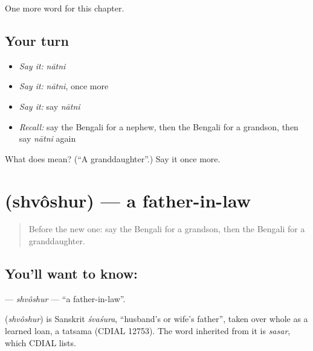 \begin{grammarlens}[title={What you've built}]
One more word for this chapter.
\end{grammarlens}

\subsection*{Your turn}
\begin{itemize}
\raggedright
  \item \emph{Say it:} \emph{nātni}
  \item \emph{Say it:} \emph{nātni}, once more
  \item \emph{Say it:} say \emph{nātni}
  \item \emph{Recall:} say the Bengali for a nephew, then the Bengali for a grandson, then say \emph{nātni} again
\end{itemize}

\begin{tcolorbox}[breakable,colback=teal!4,colframe=teal!35!black,title={Before you move on}]
What does  mean? (\textquotedblleft{}A granddaughter\textquotedblright{}.) Say it once more.
\end{tcolorbox}
\section[\texorpdfstring{\bn{শ্বশুর} (shvôshur)}{শ্বশুর (shvôshur)}]{ (shvôshur) — a father-in-law}

\label{lesson:BN-C252-shvoshur}



\begin{quote}
Before the new one: say the Bengali for a grandson, then the Bengali for a granddaughter.
\end{quote}

\subsection*{You'll want to know: }
\textbf{} — \emph{shvôshur} — \textquotedblleft{}a father-in-law\textquotedblright{}.

\begin{cousinweb}
\textbf{} (\emph{shvôshur}) is Sanskrit \emph{śvaśura}, \textquotedblleft{}husband's or wife's father\textquotedblright{}, taken over whole as a learned loan, a tatsama (CDIAL 12753). The word inherited from it is \emph{sasar}, which CDIAL lists.
\end{cousinweb}

